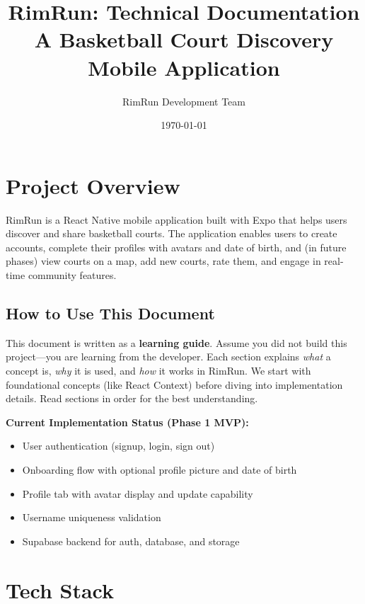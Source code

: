 \documentclass[11pt,a4paper]{article}
\title{\textbf{RimRun: Technical Documentation} \\ \large A Basketball Court Discovery Mobile Application}
\author{RimRun Development Team}
\date{\today}
\begin{document}
\maketitle
\tableofcontents
\newpage

\section{Project Overview}

RimRun is a React Native mobile application built with Expo that helps users discover and share basketball courts. The application enables users to create accounts, complete their profiles with avatars and date of birth, and (in future phases) view courts on a map, add new courts, rate them, and engage in real-time community features.

\subsection*{How to Use This Document}

This document is written as a \textbf{learning guide}. Assume you did not build this project---you are learning from the developer. Each section explains \textit{what} a concept is, \textit{why} it is used, and \textit{how} it works in RimRun. We start with foundational concepts (like React Context) before diving into implementation details. Read sections in order for the best understanding.

\textbf{Current Implementation Status (Phase 1 MVP):}
\begin{itemize}
    \item User authentication (signup, login, sign out)
    \item Onboarding flow with optional profile picture and date of birth
    \item Profile tab with avatar display and update capability
    \item Username uniqueness validation
    \item Supabase backend for auth, database, and storage
\end{itemize}

\section{Tech Stack}
\end{document}
